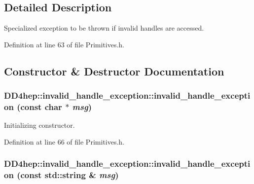 \subsection{Detailed Description}
Specialized exception to be thrown if invalid handles are accessed. 

Definition at line 63 of file Primitives.h.

\subsection{Constructor \& Destructor Documentation}
\hypertarget{class_d_d4hep_1_1invalid__handle__exception_a89d95e32d6ca7f17d77b4f44fa7ecc7a}{
\subsubsection[{invalid\_\-handle\_\-exception}]{\setlength{\rightskip}{0pt plus 5cm}DD4hep::invalid\_\-handle\_\-exception::invalid\_\-handle\_\-exception (const char $\ast$ {\em msg})}}
\label{class_d_d4hep_1_1invalid__handle__exception_a89d95e32d6ca7f17d77b4f44fa7ecc7a}


Initializing constructor. 

Definition at line 66 of file Primitives.h.\hypertarget{class_d_d4hep_1_1invalid__handle__exception_a6ed4463753276b8dc70197302a5ca085}{
\subsubsection[{invalid\_\-handle\_\-exception}]{\setlength{\rightskip}{0pt plus 5cm}DD4hep::invalid\_\-handle\_\-exception::invalid\_\-handle\_\-exception (const std::string \& {\em msg})}}
\label{class_d_d4hep_1_1invalid__handle__exception_a6ed4463753276b8dc70197302a5ca085}


